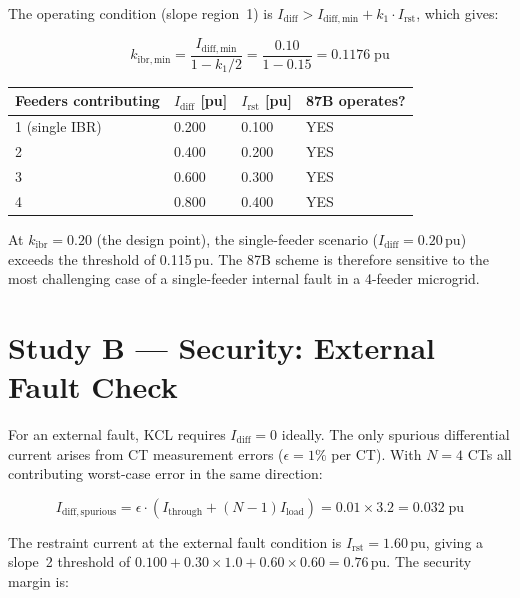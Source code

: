 \documentclass[11pt,a4paper]{article}
\begin{document}
The operating condition (slope region~1) is $I_\mathrm{diff} > I_\mathrm{diff,min}
+ k_1 \cdot I_\mathrm{rst}$, which gives:

\begin{equation}
  k_\mathrm{ibr,min} = \frac{I_\mathrm{diff,min}}{1 - k_1/2}
  = \frac{0.10}{1 - 0.15} = 0.1176\;\mathrm{pu}
\end{equation}

\begin{center}
\begin{tabular}{@{}llll@{}}
\toprule
Feeders contributing & $I_\mathrm{diff}$ [pu] & $I_\mathrm{rst}$ [pu] & 87B operates? \\
\midrule
1 (single IBR) & 0.200 & 0.100 & YES \\
2              & 0.400 & 0.200 & YES \\
3              & 0.600 & 0.300 & YES \\
4              & 0.800 & 0.400 & YES \\
\bottomrule
\end{tabular}
\end{center}

\medskip\noindent
At $k_\mathrm{ibr}=0.20$ (the design point), the single-feeder scenario
($I_\mathrm{diff}=0.20$\,pu) exceeds the threshold of 0.115\,pu.  The 87B
scheme is therefore sensitive to the most challenging case of a single-feeder
internal fault in a 4-feeder microgrid.

\section{Study B --- Security: External Fault Check}
\label{sec:studyB}

For an external fault, KCL requires $I_\mathrm{diff}=0$ ideally.  The only
spurious differential current arises from CT measurement errors ($\epsilon=1\%$
per CT).  With $N=4$ CTs all contributing worst-case error in the same direction:

\begin{equation}
  I_\mathrm{diff,spurious} = \epsilon \cdot (I_\mathrm{through} + (N-1) I_\mathrm{load})
  = 0.01 \times 3.2 = 0.032\;\mathrm{pu}
\end{equation}

The restraint current at the external fault condition is $I_\mathrm{rst}=1.60$\,pu,
giving a slope~2 threshold of $0.100 + 0.30\times1.0 + 0.60\times0.60 = 0.76$\,pu.
The security margin is:
\end{document}
